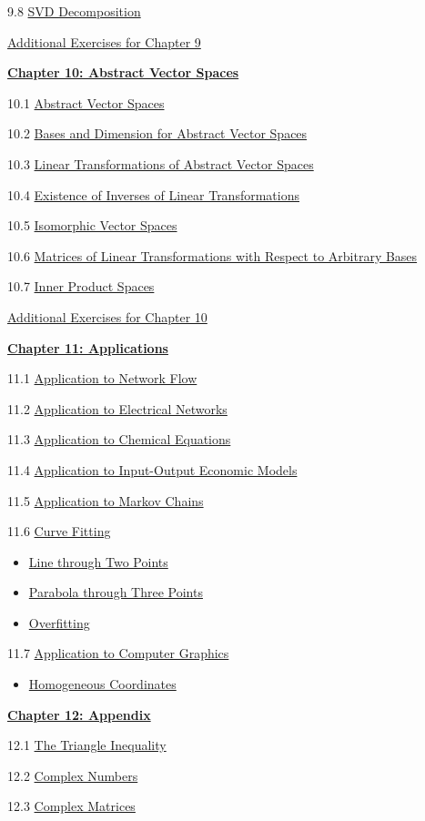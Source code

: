 \documentclass{ximera}
\begin{document}
9.8	\href{\xmbaseurl/RTH-0060/main}{SVD Decomposition}
	
\href{\xmbaseurl/SUPX-0090/main}{Additional Exercises for Chapter 9}
	
\href{\xmbaseurl/XLAChapter_vecSpaces/main}{\textbf{Chapter 10: Abstract Vector Spaces}}
	
10.1	\href{\xmbaseurl/VSP-0050/main}{Abstract Vector Spaces}
	
10.2	\href{\xmbaseurl/VSP-0060/main}{Bases and Dimension for Abstract Vector Spaces}
	
10.3	\href{\xmbaseurl/LTR-0022/main}{Linear Transformations of Abstract Vector Spaces}
	
10.4	\href{\xmbaseurl/LTR-0025/main}{Existence of Inverses of Linear Transformations}
	
10.5	\href{\xmbaseurl/LTR-0035/main}{Isomorphic Vector Spaces}
	
10.6	\href{\xmbaseurl/LTR-0060/main}{Matrices of Linear Transformations with Respect to Arbitrary Bases}
	
10.7	\href{\xmbaseurl/LTR-0080/main}{Inner Product Spaces}
	
\href{\xmbaseurl/SUPX-0100/main}{Additional Exercises for Chapter 10}
	
\href{\xmbaseurl/XLAChapter_applications/main}{\textbf{Chapter 11: Applications}}
	
11.1	\href{\xmbaseurl/APP-0010/main}{Application to Network Flow}
	
11.2	\href{\xmbaseurl/APP-0020/main}{Application to Electrical Networks}
	
11.3	\href{\xmbaseurl/APP-0030/main}{Application to Chemical Equations}
	
11.4	\href{\xmbaseurl/APP-0050/main}{Application to Input-Output Economic Models}
	
11.5	\href{\xmbaseurl/APP-0060/main}{Application to Markov Chains}

11.6 \href{\xmbaseurl/APP-0070/main}{Curve Fitting}

\begin{itemize}
    \item \href{https://www.geogebra.org/classic/aupuxe5j}{Line through Two Points}
    \item \href{https://www.geogebra.org/classic/m6mbcykf}{Parabola through Three Points}
    \item \href{https://www.geogebra.org/classic/z2qhxkmm}{Overfitting}
\end{itemize}
	
11.7	\href{\xmbaseurl/APP-0040/main}{Application to Computer Graphics}
\begin{itemize}
\item
\href{https://www.geogebra.org/m/yd5agbdg}{Homogeneous Coordinates}
\end{itemize}
	
\href{\xmbaseurl/XLAChapter_appendix/main}{\textbf{Chapter 12: Appendix}}
	
12.1	\href{\xmbaseurl/APX-0010/main}{The Triangle Inequality}
	
12.2	\href{\xmbaseurl/APX-0020/main}{Complex Numbers}
	
12.3
\href{\xmbaseurl/RTH-0050/main}{Complex Matrices}
\end{document}
